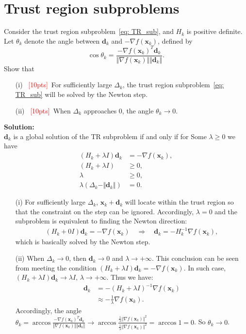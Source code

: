 \documentclass[10pt]{article}
\begin{document}
\section{Trust region subproblems}
Consider the trust region subproblem~\eqref{eq: TR_sub}, and $H_k$ is positive definite. Let $\theta_{k}$ denote the angle between $\bm{d}_{k}$ and $-\nabla f(\bm{x}_{k})$, defined by 
$$\cos\theta_{k} = \frac{-\nabla f(\bm{x}_{k})^{T}\bm{d}_{k}}{\Vert\nabla f(\bm{x}_{k})\Vert\Vert\bm{d}_{k}\Vert}.$$Show that
\begin{itemize}
	\item[(i)] ~\textcolor{red}{[10pts]}~For sufficiently large $\Delta_{k}$, the trust region subproblem~\eqref{eq: TR_sub} will be solved by the Newton step. 
	
	\item[(ii)] ~\textcolor{red}{[10pts]}~When $\Delta_{k}$ approaches $0$, the angle $\theta_{k}\to 0$.
\end{itemize}
\textbf{Solution:}\\
$\bm{d}_k$ is a global solution of the TR subproblem if and only if for Some $\lambda\ge 0$ we have 
\begin{align*}
	(H_k+\lambda I)\bm{d}_k &= -\nabla f(\bm{x}_k),\\
	(H_k + \lambda I) &\ge 0,\\
	\lambda &\ge 0 ,\\
	\lambda (\Delta_k - \Vert \bm{d}_k \Vert) &= 0.
\end{align*}
\begin{itemize}
	\item [(i)] For sufficiently large $\Delta_{k}$, $\bm{x}_k + \bm{d}_k$ will locate within the trust region so that the constraint on the step can be ignored. Accordingly, $\lambda =0 $ and the subproblem is equivalent to finding the Newton direction:
		\begin{align*}
			  (H_k+0I)\bm{d}_k = -\nabla f(\bm{x}_{k}) \quad \Rightarrow \quad  \bm{d}_k = -H_k^{-1}\nabla f(\bm{x}_{k}),
		\end{align*}
		which is basically solved by the Newton step.
	\item [(ii)] When $\Delta_k \rightarrow 0$, then $\bm{d}_k \rightarrow 0$ and $\lambda \rightarrow +\infty$. This conclusion can be seen from meeting the condition $(H_k+\lambda I)\bm{d}_k = -\nabla f(\bm{x}_k)$. In such case, $(H_k+\lambda I)\bm{d}_k\rightarrow \lambda I,\,\lambda \rightarrow +\infty$. Thus we have:
		\begin{align*}
			\bm{d}_k &=- (H_k +\lambda I)^{-1} \nabla f(\bm{x}_k)\\
			&\approx -\frac{1}{\lambda} \nabla f(\bm{x}_k).
		\end{align*}
		Accordingly, the angle $\theta_k =\arccos \frac{-\nabla f(\bm{x}_{k})^{T}\bm{d}_{k}}{\Vert\nabla f(\bm{x}_{k})\Vert\Vert\bm{d}_{k}\Vert}\rightarrow\arccos \frac{\frac{1}{\lambda}\Vert\nabla f(\bm{x}_{k})\Vert^2}{\frac{1}{\lambda} \Vert\nabla f(\bm{x}_{k})\Vert^2}=\arccos 1 = 0$. So $\theta_k\rightarrow0$.
\end{itemize}
\end{document}
